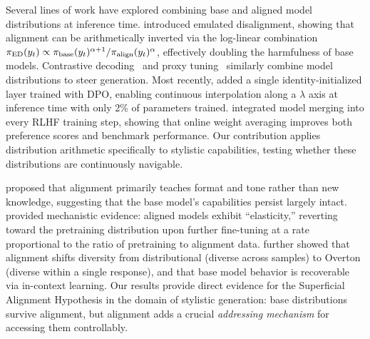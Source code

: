 Several lines of work have explored combining base and aligned model distributions
at inference time. \citet{zhou2024emulated} introduced emulated disalignment,
showing that alignment can be arithmetically inverted via the log-linear
combination $\pi_{\text{ED}}(y_t) \propto \pi_{\text{base}}(y_t)^{\alpha+1}
/ \pi_{\text{align}}(y_t)^{\alpha}$, effectively doubling the harmfulness
of base models. Contrastive decoding~\cite{li2023contrastive} and proxy
tuning~\cite{mitchell2023proxy} similarly combine model distributions to steer
generation. Most recently, \citet{zhu2025adding} added a single
identity-initialized layer trained with DPO, enabling continuous interpolation
along a $\lambda$ axis at inference time with only 2\% of parameters trained.
\citet{lu2024online} integrated model merging into every RLHF training step,
showing that online weight averaging improves both preference scores and benchmark
performance. Our contribution applies distribution arithmetic specifically to
stylistic capabilities, testing whether these distributions are continuously
navigable.

\citet{zhou2023lima} proposed that alignment primarily teaches format and tone
rather than new knowledge, suggesting that the base model's capabilities persist
largely intact. \citet{ji2024resistance} provided mechanistic evidence: aligned
models exhibit ``elasticity,'' reverting toward the pretraining distribution upon
further fine-tuning at a rate proportional to the ratio of pretraining to alignment
data. \citet{lake2024distributional} further showed that alignment shifts diversity
from distributional (diverse across samples) to Overton (diverse within a single
response), and that base model behavior is recoverable via in-context learning.
Our results provide direct evidence for the Superficial Alignment Hypothesis in the
domain of stylistic generation: base distributions survive alignment, but alignment
adds a crucial \emph{addressing mechanism} for accessing them controllably.
